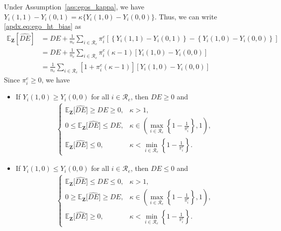 \documentclass[11pt]{article}
\theoremstyle{definition}
\def \bZ {\boldsymbol{Z}}
\def \cR {\mathcal{R}}
\def \EX {\mathbb{E}}
\begin{document}
Under Assumption~\ref{ass:egos_kappa}, we have $Y_i(1,1) - Y_i(0,1) = \kappa \{Y_i(1,0) - Y_i(0,0)\}$.
Thus, we can write \eqref{apdx.eq:ego_ht_bias} as 
\begin{equation*}
    \begin{aligned}
    \EX_{\bZ}\left[\widehat{DE}\right]
    &=
    DE + 
    \frac{1}{n_e} 
    \sum_{i\in\cR_e}
    \pi_i^e
    \left[
    \left\{ Y_i(1, 1) - Y_i(0,1)\right\} 
    - \left\{ Y_i(1,0) - Y_i(0,0)\right\}
    \right]  
    \\ &=
    DE +
    \frac{1}{n_e}
    \sum_{i\in\cR_e}
    \pi_i^e (\kappa-1)
    \left[Y_i(1,0) - Y_i(0,0)\right]
    \\ &=
    \frac{1}{n_e}
    \sum_{i\in\cR_e}
    \left[1 + \pi_i^e (\kappa-1)\right]
    \left[Y_i(1,0) - Y_i(0,0)\right]
    \end{aligned}
\end{equation*}
Since $\pi_i^e \geq 0$, we have
\begin{itemize}
    \item If $Y_i(1,0) \geq Y_i(0,0)$ for all $i\in\cR_e$, then $DE \geq 0$ and 
        \begin{align*}
    \begin{cases}
        \EX_{\bZ}\big[\widehat{DE}\big] \geq DE \geq 0, & \kappa > 1, \\
        0 \leq \EX_{\bZ}\big[\widehat{DE}\big] \leq DE, & 
            \kappa \in \left( \max_{i \in \cR_e}\left\{1 - \frac{1}{\pi_i^e}\right\},
             1 \right), \\
        \EX_{\bZ}\big[\widehat{DE}\big] \leq 0, & \kappa < \min_{i \in \cR_e}\left\{1 - \frac{1}{\pi_i^e}\right\}.
    \end{cases}
\end{align*}
    \item If $Y_i(1,0) \leq Y_i(0,0)$ for all $i\in\cR_e$, then $DE \leq 0$ and 
        \begin{align*}
    \begin{cases}
        \EX_{\bZ}\big[\widehat{DE}\big] \leq DE \leq 0, & \kappa > 1, \\
        0 \geq \EX_{\bZ}\big[\widehat{DE}\big] \geq DE, & \kappa \in
             \left( \max_{i \in \cR_e}\left\{1 - \frac{1}{\pi_i^e}\right\}, 1 \right), \\
        \EX_{\bZ}\big[\widehat{DE}\big] \geq 0, & \kappa < \min_{i \in \cR_e}\left\{1 - \frac{1}{\pi_i^e}\right\}.
    \end{cases}
    \end{align*}
\end{itemize}
\end{document}
